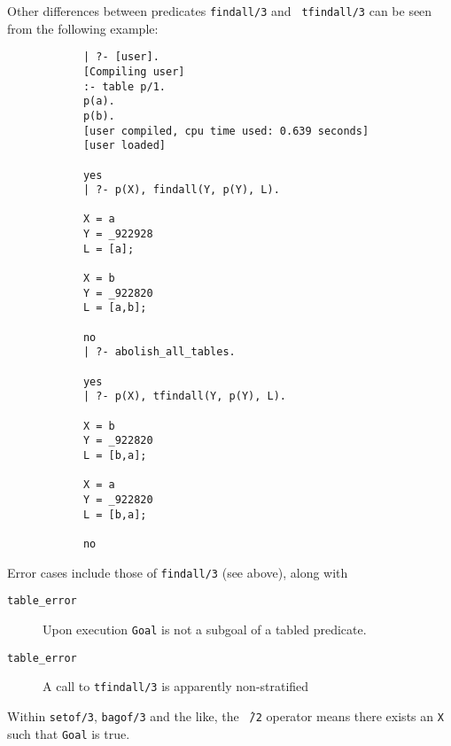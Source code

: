 \begin{description}
Other differences between predicates {\tt findall/3} and {\tt
  tfindall/3} can be seen from the following example:

    {\footnotesize
    \begin{verbatim}
            | ?- [user].
            [Compiling user]
            :- table p/1.
            p(a).
            p(b).
            [user compiled, cpu time used: 0.639 seconds]
            [user loaded]

            yes
            | ?- p(X), findall(Y, p(Y), L).

            X = a
            Y = _922928
            L = [a];

            X = b
            Y = _922820
            L = [a,b];

            no
            | ?- abolish_all_tables.

            yes
            | ?- p(X), tfindall(Y, p(Y), L).

            X = b
            Y = _922820
            L = [b,a];

            X = a
            Y = _922820
            L = [b,a];

            no
    \end{verbatim}
    }

Error cases include those of {\tt findall/3} (see above), along with 
    \begin{description}
    \item[{\tt table\_error}]
	Upon execution {\tt Goal} is not a subgoal of a tabled predicate.
    \item[{\tt table\_error}]
	A call to {\tt tfindall/3} is apparently non-stratified
    \end{description}




%
Within {\tt setof/3}, {\tt bagof/3} and the like, the {\tt \^\ /2}
operator means there exists an {\tt X} such that {\tt Goal} is true.


\end{description}
